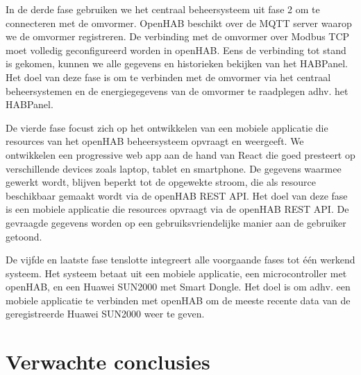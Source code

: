 \documentclass{hogent-article}
\begin{document}
    In de derde fase gebruiken we het centraal beheersysteem uit fase 2 om te connecteren met de omvormer. OpenHAB beschikt over de MQTT server waarop we de omvormer registreren. De verbinding met de omvormer over Modbus TCP moet volledig geconfigureerd worden in openHAB. Eens de verbinding tot stand is gekomen, kunnen we alle gegevens en historieken bekijken van het HABPanel. Het doel van deze fase is om te verbinden met de omvormer via het centraal beheersystemen en de energiegegevens van de omvormer te raadplegen adhv. het HABPanel.
    
    De vierde fase focust zich op het ontwikkelen van een mobiele applicatie die resources van het openHAB beheersysteem opvraagt en weergeeft. We ontwikkelen een progressive web app aan de hand van React die goed presteert op verschillende devices zoals laptop, tablet en smartphone. De gegevens waarmee gewerkt wordt, blijven beperkt tot de opgewekte stroom, die als resource beschikbaar gemaakt wordt via de openHAB REST API. Het doel van deze fase is een mobiele applicatie die resources opvraagt via de openHAB REST API. De gevraagde gegevens worden op een gebruiksvriendelijke manier aan de gebruiker getoond.
    
    De vijfde en laatste fase tenslotte integreert alle voorgaande fases tot één werkend systeem. Het systeem betaat uit een mobiele applicatie, een microcontroller met openHAB, en een Huawei SUN2000 met Smart Dongle. Het doel is om adhv. een mobiele applicatie te verbinden met openHAB om de meeste recente data van de geregistreerde Huawei SUN2000 weer te geven.
    
    \section{Verwachte conclusies}
    
    
    \lipsum[14-18]
    
    
    \printbibliography[heading=bibintoc]
    
\end{document}
